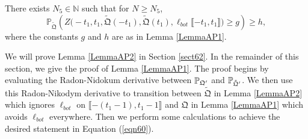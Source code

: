 \begin{lemma}\label{LemmaAP2} There exists $N_5 \in \mathbb{N}$ such that for $N \geq N_5$,
	\begin{equation}\label{eqn57}
		\mathbb{P}_{\tilde{\mathfrak{Q}}} \left( Z\big(  -t_1, t_1, \tilde{\mathfrak{Q}}(-t_1) , \tilde{\mathfrak{Q}}(t_1), \ell_{bot}\llbracket -t_1, t_1\rrbracket\big)\geq g    \right) \geq h,
	\end{equation}
	where the constants $g$ and $h$ are as in Lemma \ref{LemmaAP1}.
\end{lemma}
We will prove Lemma \ref{LemmaAP2} in Section \ref{sect62}. In the remainder of this section, we give the proof of Lemma \ref{LemmaAP1}. The proof begins by evaluating the Radon-Nidokum derivative between $\mathbb{P}_{\mathfrak{Q}'}$ and $\mathbb{P}_{\tilde{\mathfrak{Q}}'}$. We then use this Radon-Nikodym derivative to transition between $\tilde{\mathfrak{Q}}$ in Lemma \ref{LemmaAP2} which ignores $\ell_{bot}$ on $\llbracket -(t_1-1),t_1-1\rrbracket$ and $\mathfrak{Q}$ in Lemma \ref{LemmaAP1} which avoids $\ell_{bot}$ everywhere. Then we perform some calculations to achieve the desired statement in Equation (\ref{eqn60}).
